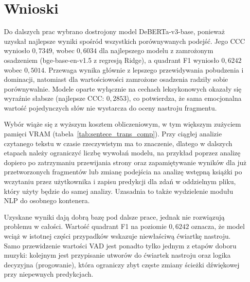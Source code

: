 \FloatBarrier
\section{Wnioski}
Do dalszych prac wybrano dostrojony model DeBERTa-v3-base, ponieważ uzyskał
najlepsze wyniki spośród wszystkich porównywanych podejść. Jego CCC wyniosło
$0{,}7349$, wobec $0{,}6034$ dla najlepszego modelu z zamrożonym osadzeniem
(bge-base-en-v1.5 z regresją Ridge), a quadrant F1 wyniosło $0{,}6242$ wobec
$0{,}5014$. Przewaga wynika głównie z lepszego przewidywania pobudzenia
i dominacji, natomiast dla wartościowości zamrożone osadzenia radziły sobie
porównywalnie. Modele oparte wyłącznie na cechach leksykonowych okazały się
wyraźnie słabsze (najlepsze CCC: $0{,}2853$), co potwierdza, że sama emocjonalna
wartość pojedynczych słów nie wystarcza do oceny nastroju fragmentu.

Wybór wiąże się z wyższym kosztem obliczeniowym, w tym większym zużyciem pamięci
VRAM (tabela~\ref{tab:sentece_trans_comp}). Przy ciągłej analizie czytanego
tekstu w czasie rzeczywistym ma to znaczenie, dlatego w dalszych etapach należy
ograniczyć liczbę wywołań modelu, na przykład poprzez analizę dopiero po
zatrzymaniu przewijania strony oraz zapamiętywanie wyników dla już
przetworzonych fragmentów lub zmianę podejścia na analizę wstępną książki po wczytaniu przez
użytkownika i zapisu predykcji dla zdań w oddzielnym pliku, który użyty będzie do samej analizy. 
Uzasadnia to także wydzielenie modułu NLP do osobnego kontenera.

Uzyskane wyniki dają dobrą bazę pod dalsze prace, jednak nie rozwiązują
problemu w całości. Wartość quadrant F1 na poziomie $0{,}6242$ oznacza, że model
wciąż w istotnej części przypadków wskazuje niewłaściwą ćwiartkę nastroju. Samo przewidzenie 
wartości VAD jest ponadto tylko jednym z etapów doboru muzyki: kolejnym jest przypisanie
utworów do ćwiartek nastroju oraz logika decyzyjna (progowanie), która ograniczy
zbyt częste zmiany ścieżki dźwiękowej przy niepewnych predykcjach.
